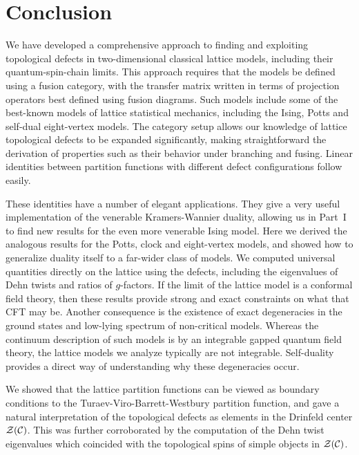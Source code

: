 
\section{Conclusion}
\label{sec:conclusion}

We have developed a comprehensive approach to finding and exploiting topological defects in two-dimensional classical lattice models, including their quantum-spin-chain limits. This approach requires that the models be defined using a fusion category, with the transfer matrix written in terms of projection operators best defined using fusion diagrams. Such models include some of the best-known models of lattice statistical mechanics, including the Ising, Potts and self-dual eight-vertex models. The category setup allows our knowledge of lattice topological defects to be expanded significantly, making straightforward the derivation of properties such as their behavior under branching and fusing.  Linear identities between partition functions with different defect configurations follow easily.

These identities have a number of elegant applications.
They give a very useful implementation of the venerable Kramers-Wannier duality, allowing us in Part~I to find new results for the even more venerable Ising model. Here we derived the analogous results for the Potts, clock and eight-vertex models, and showed how to generalize duality itself to a far-wider class of models. 
We computed universal quantities directly on the lattice using the defects, including the eigenvalues of Dehn twists and ratios of $g$-factors.
If the limit of the lattice model is a conformal field theory, then these results provide strong and exact constraints on what that CFT may be. 
Another consequence is the existence of exact degeneracies in the ground states and low-lying spectrum of non-critical models. 
Whereas the continuum description of such models is by an integrable gapped quantum field theory, the lattice models we analyze typically are not integrable. Self-duality provides a direct way of understanding why these degeneracies occur.

We showed that the lattice partition functions can be viewed as boundary conditions to the Turaev-Viro-Barrett-Westbury partition function, and gave a natural interpretation of the topological defects as elements in the Drinfeld center $\mathcal{Z}(\mathcal{C})$.
This was further corroborated by the computation of the Dehn twist eigenvalues which coincided with the topological spins of simple objects in $\mathcal{Z}(\mathcal{C})$.


